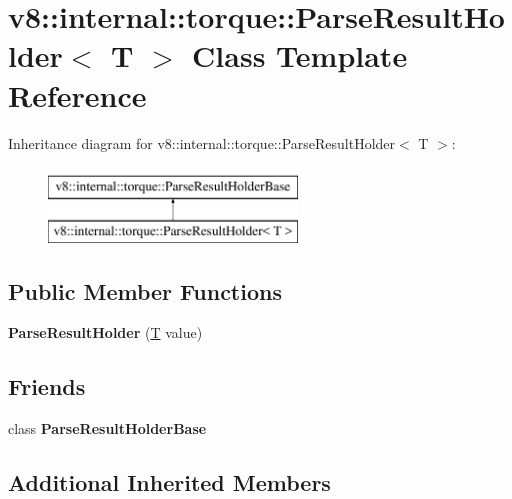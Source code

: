 \hypertarget{classv8_1_1internal_1_1torque_1_1ParseResultHolder}{}\section{v8\+:\+:internal\+:\+:torque\+:\+:Parse\+Result\+Holder$<$ T $>$ Class Template Reference}
\label{classv8_1_1internal_1_1torque_1_1ParseResultHolder}
Inheritance diagram for v8\+:\+:internal\+:\+:torque\+:\+:Parse\+Result\+Holder$<$ T $>$\+:\begin{figure}[H]
\begin{center}
\leavevmode
\includegraphics[height=2.000000cm]{classv8_1_1internal_1_1torque_1_1ParseResultHolder}
\end{center}
\end{figure}
\subsection*{Public Member Functions}
\begin{DoxyCompactItemize}
\item 
\mbox{\label{classv8_1_1internal_1_1torque_1_1ParseResultHolder_ad61672e953eeae3e76ab0dff0c9a852a}} 
{\bfseries Parse\+Result\+Holder} (\mbox{\hyperlink{classv8_1_1internal_1_1torque_1_1T}{T}} value)
\end{DoxyCompactItemize}
\subsection*{Friends}
\begin{DoxyCompactItemize}
\item 
\mbox{\label{classv8_1_1internal_1_1torque_1_1ParseResultHolder_a8f01ffa1d1c5fe882e5a38e26f86cc47}} 
class {\bfseries Parse\+Result\+Holder\+Base}
\end{DoxyCompactItemize}
\subsection*{Additional Inherited Members}


